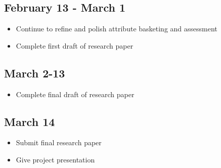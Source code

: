 \subsection*{February 13 - March 1}
\begin{itemize}
\item{Continue to refine and polish attribute basketing and assessment}
\item{Complete first draft of research paper}
\end{itemize}

\subsection*{March 2-13}
\begin{itemize}
\item{Complete final draft of research paper}
\end{itemize}

\subsection*{March 14}
\begin{itemize}
\item{Submit final research paper}
\item{Give project presentation}
\end{itemize}